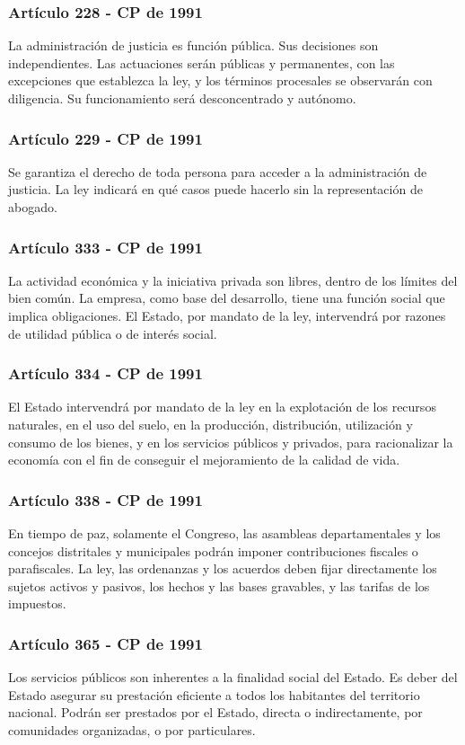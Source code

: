 \documentclass{beamer}
\begin{document}
\begin{frame}
  \frametitle{Art\'iculo 228 - CP de 1991}
  La administraci\'on de justicia es funci\'on p\'ublica. Sus decisiones son independientes. Las actuaciones ser\'an p\'ublicas y permanentes, con las excepciones que establezca la ley, y los t\'erminos procesales se observar\'an con diligencia. Su funcionamiento ser\'a desconcentrado y aut\'onomo.
\end{frame}

\begin{frame}
  \frametitle{Art\'iculo 229 - CP de 1991}
  Se garantiza el derecho de toda persona para acceder a la administraci\'on de justicia. La ley indicar\'a en qu\'e casos puede hacerlo sin la representaci\'on de abogado.
\end{frame}

\begin{frame}
  \frametitle{Art\'iculo 333 - CP de 1991}
  La actividad econ\'omica y la iniciativa privada son libres, dentro de los l\'imites del bien com\'un. La empresa, como base del desarrollo, tiene una funci\'on social que implica obligaciones. El Estado, por mandato de la ley, intervendr\'a por razones de utilidad p\'ublica o de inter\'es social.
\end{frame}

\begin{frame}
  \frametitle{Art\'iculo 334 - CP de 1991}
  El Estado intervendr\'a por mandato de la ley en la explotaci\'on de los recursos naturales, en el uso del suelo, en la producci\'on, distribuci\'on, utilizaci\'on y consumo de los bienes, y en los servicios p\'ublicos y privados, para racionalizar la econom\'ia con el fin de conseguir el mejoramiento de la calidad de vida.
\end{frame}

\begin{frame}
  \frametitle{Art\'iculo 338 - CP de 1991}
  En tiempo de paz, solamente el Congreso, las asambleas departamentales y los concejos distritales y municipales podr\'an imponer contribuciones fiscales o parafiscales. La ley, las ordenanzas y los acuerdos deben fijar directamente los sujetos activos y pasivos, los hechos y las bases gravables, y las tarifas de los impuestos.
\end{frame}

\begin{frame}
  \frametitle{Art\'iculo 365 - CP de 1991}
  Los servicios p\'ublicos son inherentes a la finalidad social del Estado. Es deber del Estado asegurar su prestaci\'on eficiente a todos los habitantes del territorio nacional. Podr\'an ser prestados por el Estado, directa o indirectamente, por comunidades organizadas, o por particulares.
\end{frame}
\end{document}
